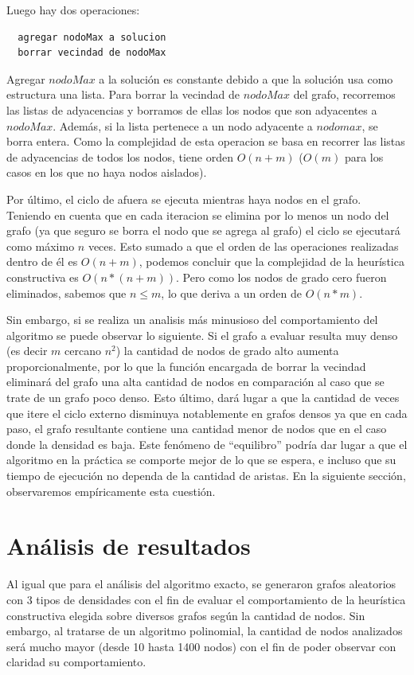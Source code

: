 \documentclass[a4paper,11pt] {article}
\begin{document}
Luego hay dos operaciones:
\begin{verbatim}
  agregar nodoMax a solucion
  borrar vecindad de nodoMax
\end{verbatim}

Agregar $nodoMax$ a la solución es constante debido a que la solución usa como estructura una lista. Para borrar la vecindad de $nodoMax$ del grafo, recorremos las listas de adyacencias y borramos de ellas los nodos que son adyacentes a $nodoMax$. Además, si la lista pertenece a un nodo adyacente a $nodomax$, se borra entera. Como la complejidad de esta operacion se basa en recorrer las listas de adyacencias de todos los nodos, tiene orden $O(n + m)$ ($O(m)$ para los casos en los que no haya nodos aislados).

Por último, el ciclo de afuera se ejecuta mientras haya nodos en el grafo. Teniendo en cuenta que en cada iteracion se elimina por lo menos un nodo del grafo (ya que seguro se borra el nodo que se agrega al grafo) el ciclo se ejecutará como máximo $n$ veces. Esto sumado a que el orden de las operaciones realizadas dentro de él es $O(n + m)$, podemos concluir que la complejidad de la heurística constructiva es $O(n*(n + m))$. Pero como los nodos de grado cero fueron eliminados, sabemos que $n \leq m$, lo que deriva a un orden de $O(n*m)$.

Sin embargo, si se realiza un analisis más minusioso del comportamiento del algoritmo se puede observar lo siguiente. Si el grafo a evaluar resulta muy denso (es decir $m$ cercano $n^2$) la cantidad de nodos de grado alto aumenta proporcionalmente, por lo que la función encargada de borrar la vecindad eliminará del grafo una alta cantidad de nodos en comparación al caso que se trate de un grafo poco denso. Esto último, dará lugar a que la cantidad de veces que itere el ciclo externo disminuya notablemente en grafos densos ya que en cada paso, el grafo resultante contiene una cantidad menor de nodos que en el caso donde la densidad es baja. Este fenómeno de ``equilibro'' podría dar lugar a que el algoritmo en la práctica se comporte mejor de lo que se espera, e incluso que su tiempo de ejecución no dependa de la cantidad de aristas. En la siguiente sección, observaremos empíricamente esta cuestión.

\section*{An\'alisis de resultados}

Al igual que para el análisis del algoritmo exacto, se generaron grafos aleatorios con 3 tipos de densidades con el fin de evaluar el comportamiento de la heurística constructiva elegida sobre diversos grafos según la cantidad de nodos. Sin embargo, al tratarse de un algoritmo polinomial, la cantidad de nodos analizados será mucho mayor (desde 10 hasta 1400 nodos) con el fin de poder observar con claridad su comportamiento.
\end{document}
